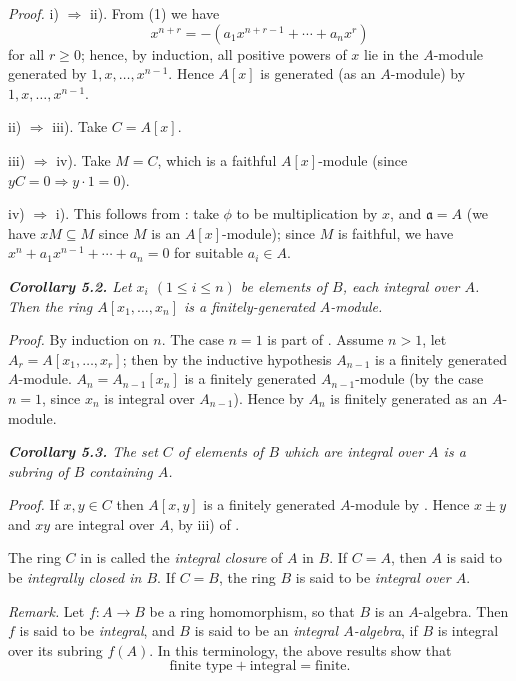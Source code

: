 \noindent\emph{Proof.}  i) $\Rightarrow$ ii).  From (1) we have
\[
x^{n+r}=-(a_1x^{n+r-1}+\cdots+a_nx^r)
\]
for all $r\geq0$; hence, by induction, all positive powers of $x$ lie in the $A$-module
generated by $1,x,\ldots,x^{n-1}$.  Hence $A[x]$ is generated (as an $A$-module) by
$1,x,\ldots,x^{n-1}$.

ii) $\Rightarrow$ iii).  Take $C=A[x]$.

iii) $\Rightarrow$ iv).  Take $M=C$, which is a faithful $A[x]$-module (since $yC=0\Rightarrow
y\cdot1=0$).

iv) $\Rightarrow$ i).  This follows from : take $\phi$ to be multiplication by $x$, and
$\mathfrak a=A$ (we have $xM\subseteq M$ since $M$ is an $A[x]$-module); since $M$ is faithful, we
have $x^n+a_1x^{n-1}+\cdots+a_n=0$ for suitable $a_i\in A$.\proofbox

\medskip
\noindent\textit{\textbf{Corollary 5.2.} Let $x_i$ $(1\leq i\leq n)$ be elements of $B$, each integral over $A$.
Then the ring $A[x_1,\ldots,x_n]$ is a finitely-generated $A$-module.}

\noindent\emph{Proof.}  By induction on $n$.  The case $n=1$ is part of .  Assume $n>1$, let
$A_r=A[x_1,\ldots,x_r]$; then by the inductive hypothesis $A_{n-1}$ is a finitely generated
$A$-module.  $A_n=A_{n-1}[x_n]$ is a finitely generated $A_{n-1}$-module (by the case
$n=1$, since $x_n$ is integral over $A_{n-1}$).  Hence by  $A_n$ is finitely generated
as an $A$-module.\proofbox

\medskip
\noindent\textit{\textbf{Corollary 5.3.} The set $C$ of elements of $B$ which are integral over $A$ is a
subring of $B$ containing $A$.}

\noindent\emph{Proof.}  If $x,y\in C$ then $A[x,y]$ is a finitely generated $A$-module by .  Hence
$x\pm y$ and $xy$ are integral over $A$, by iii) of .\proofbox

The ring $C$ in  is called the \emph{integral closure} of $A$ in $B$.  If $C=A$, then $A$
is said to be \emph{integrally closed in $B$}.  If $C=B$, the ring $B$ is said to be \emph{integral
over $A$}.

\emph{Remark.}  Let $f:A\longrightarrow B$ be a ring homomorphism, so that $B$ is an $A$-algebra.
Then $f$ is said to be \emph{integral}, and $B$ is said to be an \emph{integral $A$-algebra}, if $B$ is
integral over its subring $f(A)$.  In this terminology, the above results show that
\[
\text{finite type}+\text{integral}=\text{finite}.
\]

